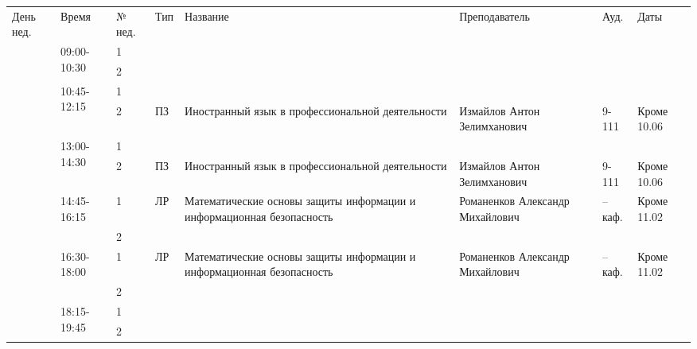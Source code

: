 \begin{tabular}{|p{1cm}|p{2.1cm}|p{0.7cm}|p{1cm}|p{9cm}|p{4cm}|p{2.5cm}|p{2.5cm}|}
\hline
День нед. & Время & № нед. & Тип & Название & Преподаватель & Ауд. & Даты \\
\hhline{|=|=|=|=|=|=|=|=|}
\multirow{12}{*}{Чт} & \multirow{2}{*}{09:00-10:30} & 1 &  &  &  &  & \\
\cline{3-8} & & 2 &  &  &  &  & \\
\cline{2-8} & \multirow{2}{*}{10:45-12:15} & 1 &  &  &  &  & \\
\cline{3-8} & & 2 & ПЗ  & Иностранный язык в профессиональной деятельности & Измайлов Антон Зелимханович & 9-111 & Кроме 10.06\\
\cline{2-8} & \multirow{2}{*}{13:00-14:30} & 1 &  &  &  &  & \\
\cline{3-8} & & 2 & ПЗ  & Иностранный язык в профессиональной деятельности & Измайлов Антон Зелимханович & 9-111 & Кроме 10.06\\
\cline{2-8} & \multirow{2}{*}{14:45-16:15} & 1 & ЛР  & Математические основы защиты информации и информационная безопасность & Романенков Александр Михайлович & --каф. & Кроме 11.02\\
\cline{3-8} & & 2 &  &  &  &  & \\
\cline{2-8} & \multirow{2}{*}{16:30-18:00} & 1 & ЛР  & Математические основы защиты информации и информационная безопасность & Романенков Александр Михайлович & --каф. & Кроме 11.02\\
\cline{3-8} & & 2 &  &  &  &  & \\
\cline{2-8} & \multirow{2}{*}{18:15-19:45} & 1 &  &  &  &  & \\
\cline{3-8} & & 2 &  &  &  &  & \\
\hline
\end{tabular}
\newpage

